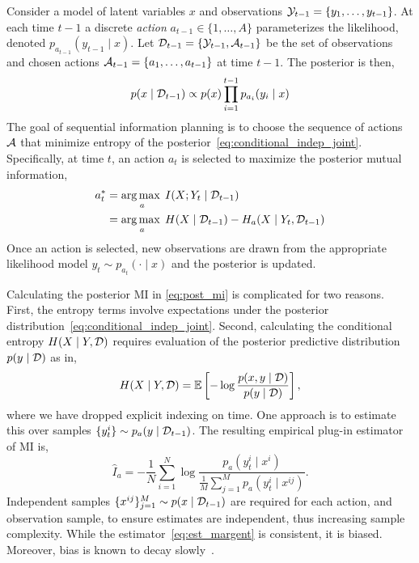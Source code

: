 Consider a model of latent variables $x$ and observations $\mathcal{Y}_{t-1}
= \{y_1,\ldots,y_{t-1}\}$.  At each time $t-1$ a discrete
\emph{action} $a_{t-1} \in \{1,\ldots,A\}$ parameterizes the
likelihood, denoted \mbox{$p_{a_{t-1}}(y_{t-1} \mid x)$}.  Let
$\mathcal{D}_{t-1} = \{\mathcal{Y}_{t-1},\mathcal{A}_{t-1}\}$ be the set of observations
and chosen actions \mbox{$\mathcal{A}_{t-1} =
\{a_1,\ldots,a_{t-1}\}$} at time $t-1$.  The posterior is then,
\begin{equation}\label{eq:conditional_indep_joint}
  p(x\mid \mathcal{D}_{t-1}) \propto
    p(x) \prod_{i=1}^{t-1} p_{a_i}(y_i \mid x)
\end{equation}
The goal of sequential information planning is to choose the sequence
of actions $\mathcal{A}$ that minimize entropy of the
posterior~\eqref{eq:conditional_indep_joint}.  Specifically, at time
$t$, an action $a_t$ is selected to maximize the posterior mutual
information,
\begin{align}\label{eq:post_mi}
  a_t^{*} &= \operatorname*{arg\,max\;}_a I(X;Y_t \mid \mathcal{D}_{t-1}) \notag \\
          &= \operatorname*{arg\,max\;}_a H(X\mid \mathcal{D}_{t-1}) - H_a(X \mid Y_t, \mathcal{D}_{t-1})
\end{align}
Once an action is selected, new observations are drawn from the
appropriate likelihood model $y_t \sim p_{a_t}(\cdot \mid x)$ and the
posterior is updated.


Calculating the posterior MI in \EQN\eqref{eq:post_mi} is complicated
for two reasons.  First, the entropy terms involve expectations under
the posterior distribution~\eqref{eq:conditional_indep_joint}.
Second, calculating the conditional entropy $H(X\mid Y, \mathcal{D})$ requires
evaluation of the posterior predictive distribution $p(y\mid \mathcal{D})$
as in,
\[
  H(X\mid Y, \mathcal{D}) = \mathbb{E}\left[
    - \log \frac{p(x,y\mid \mathcal{D})}{ p(y\mid \mathcal{D}) } \right],
\]
where we have dropped explicit indexing on time.  One approach is to
estimate this over samples \mbox{$\{y^i_t\} \sim
p_a(y\mid \mathcal{D}_{t-1})$}.  The resulting empirical plug-in estimator
of MI is,
\begin{equation}\label{eq:est_margent}
  \hat{I}_a = - \frac{1}{N} \sum_{i=1}^N \log \frac{
    p_a(y_t^i\mid x^i) }{\frac{1}{M}
        \sum_{j=1}^M p_a(y_t^i \mid x^{ij})}.
\end{equation}
Independent samples $\{x^{ij}\}_{j=1}^M \sim p(x \mid \mathcal{D}_{t-1})$
are required for each action, and observation sample, to ensure
estimates are independent, thus increasing sample complexity.  While
the estimator~\eqref{eq:est_margent} is consistent, it is biased.
Moreover, bias is known to decay slowly~\citep{zheng2018robust,
rainforth2018nesting}.

